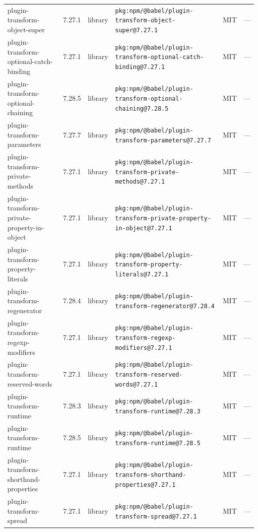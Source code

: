 \documentclass[11pt,a4paper]{article}
\begin{document}
\begin{longtable}{|p{4cm}|p{2cm}|p{1.6cm}|p{5cm}|p{1.5cm}|p{3.5cm}|}
\raggedright plugin-transform-object-super & 7.27.1 & library & \small\texttt{pkg:npm/@babel/plugin-transform-object-super@7.27.1} & MIT & \small — \\
\raggedright plugin-transform-optional-catch-binding & 7.27.1 & library & \small\texttt{pkg:npm/@babel/plugin-transform-optional-catch-binding@7.27.1} & MIT & \small — \\
\raggedright plugin-transform-optional-chaining & 7.28.5 & library & \small\texttt{pkg:npm/@babel/plugin-transform-optional-chaining@7.28.5} & MIT & \small — \\
\raggedright plugin-transform-parameters & 7.27.7 & library & \small\texttt{pkg:npm/@babel/plugin-transform-parameters@7.27.7} & MIT & \small — \\
\raggedright plugin-transform-private-methods & 7.27.1 & library & \small\texttt{pkg:npm/@babel/plugin-transform-private-methods@7.27.1} & MIT & \small — \\
\raggedright plugin-transform-private-property-in-object & 7.27.1 & library & \small\texttt{pkg:npm/@babel/plugin-transform-private-property-in-object@7.27.1} & MIT & \small — \\
\raggedright plugin-transform-property-literals & 7.27.1 & library & \small\texttt{pkg:npm/@babel/plugin-transform-property-literals@7.27.1} & MIT & \small — \\
\raggedright plugin-transform-regenerator & 7.28.4 & library & \small\texttt{pkg:npm/@babel/plugin-transform-regenerator@7.28.4} & MIT & \small — \\
\raggedright plugin-transform-regexp-modifiers & 7.27.1 & library & \small\texttt{pkg:npm/@babel/plugin-transform-regexp-modifiers@7.27.1} & MIT & \small — \\
\raggedright plugin-transform-reserved-words & 7.27.1 & library & \small\texttt{pkg:npm/@babel/plugin-transform-reserved-words@7.27.1} & MIT & \small — \\
\raggedright plugin-transform-runtime & 7.28.3 & library & \small\texttt{pkg:npm/@babel/plugin-transform-runtime@7.28.3} & MIT & \small — \\
\raggedright plugin-transform-runtime & 7.28.5 & library & \small\texttt{pkg:npm/@babel/plugin-transform-runtime@7.28.5} & MIT & \small — \\
\raggedright plugin-transform-shorthand-properties & 7.27.1 & library & \small\texttt{pkg:npm/@babel/plugin-transform-shorthand-properties@7.27.1} & MIT & \small — \\
\raggedright plugin-transform-spread & 7.27.1 & library & \small\texttt{pkg:npm/@babel/plugin-transform-spread@7.27.1} & MIT & \small — \\

\end{longtable}
\end{document}
